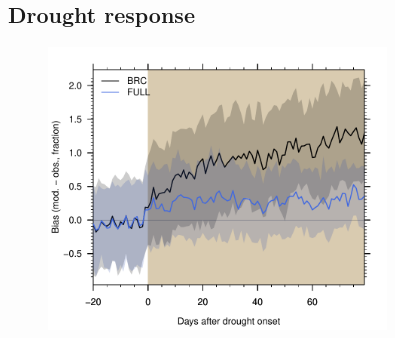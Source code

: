 \documentclass{myreport}
\begin{document}
\clearpage

\subsection{Drought response}

\begin{figure}[!ht]
    \centering
\includegraphics[width=0.8\textwidth]{fig/droughtresponse.pdf}
    \caption{}
    \label{fig:modobs_droughtresponse}
\end{figure}

\clearpage

\end{document}
